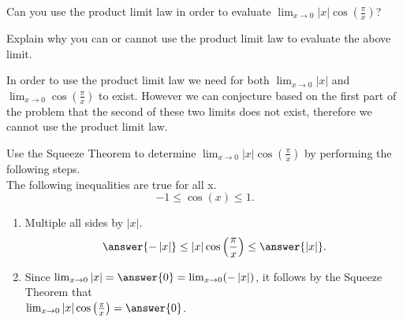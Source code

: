 \documentclass{ximera}
\begin{document}
\begin{exercise}
\begin{exercise}
\begin{exercise}

Can you use the product limit law in order to evaluate $\lim_{x\to0}\left|x\right|\cos\left(\frac{\pi}{x}\right)$?
\begin{multipleChoice}
\end{multipleChoice}

\begin{question}
Explain why you can or cannot use the product limit law to evaluate the above limit.
\begin{freeResponse}
In order to use the product limit law we need for both $\lim_{x\to0}\left|x\right|$ and $\lim_{x\to0}\cos\left(\frac{\pi}{x}\right)$ to exist.  However we can conjecture based on the first part of the problem that the second of these two limits does not exist, therefore we cannot use the product limit law.
\end{freeResponse}
\end{question}

\begin{exercise}


Use the Squeeze Theorem to determine $\lim_{x\to0}\left|x\right|\cos\left(\frac{\pi}{x}\right)$ by performing the following steps.\\

The following inequalities are true for all x.
\[
-1\leq\cos\left(x\right)\leq1.
\]  
\begin{enumerate}
\item Multiple all sides by $\left|x\right|$. 
\[
\answer{-\left|x\right|}\leq\left|x\right|\cos\left(\frac{\pi}{x}\right)\leq\answer{\left|x\right|}.
\]

\item Since $\lim_{x\to0}\left|x\right| = \answer{0} = \lim_{x\to0}(-\left|x\right|)$, it follows by the Squeeze Theorem that\\[1em]  $\lim_{x\to0}\left|x\right|\cos\left(\frac{\pi}{x}\right)=\answer{0}$.
\end{enumerate}
\end{exercise}
\end{exercise}
\end{exercise}
\end{exercise}
\end{document}

